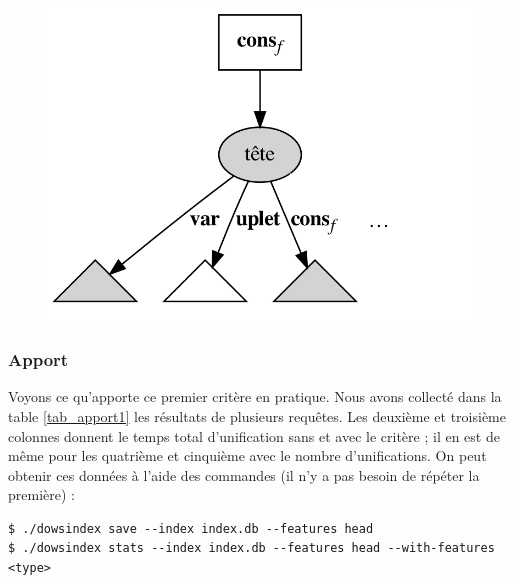 \documentclass[a4paper]{report}
\theoremstyle{definition}
\begin{document}
\begin{figure}[h]
\begin{center}
    \includegraphics[scale=0.13]{graphs/crit1_3}
  \end{center}
  \caption{\label{fig_crit1}}
\end{figure}

\subsubsection{Apport}

Voyons ce qu'apporte ce premier critère en pratique. Nous avons collecté dans la table \ref{tab_apport1} les résultats de plusieurs requêtes. Les deuxième et troisième colonnes donnent le temps total d'unification sans et avec le critère ; il en est de même pour les quatrième et cinquième avec le nombre d'unifications. On peut obtenir ces données à l'aide des commandes (il n'y a pas besoin de répéter la première) :

\begin{verbatim}
$ ./dowsindex save --index index.db --features head
$ ./dowsindex stats --index index.db --features head --with-features <type>
\end{verbatim}
\end{document}
